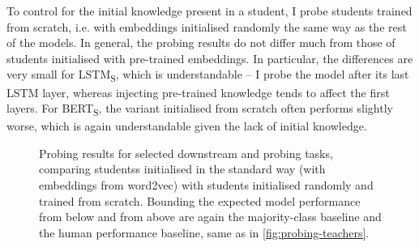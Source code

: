 \documentclass[bsc,frontabs,singlespacing,parskip,deptreport]{infthesis}
\def\BERTS{BERT\textsubscript{S}}
\def\LSTMS{LSTM\textsubscript{S}}
\begin{document}
{{{      To control for the initial knowledge present in a student, I probe students trained from scratch, i.e. with embeddings initialised randomly the same way as the rest of the models. In general, the probing results do not differ much from those of students initialised with pre-trained embeddings. In particular, the differences are very small for \LSTMS, which is understandable -- I probe the model after its last LSTM layer, whereas injecting pre-trained knowledge tends to affect the first layers. For \BERTS, the variant initialised from scratch often performs slightly worse, which is again understandable given the lack of initial knowledge.

      \begin{figure}[h!tb]
        \centering
        \caption{Probing results for selected downstream and probing tasks, comparing studentss initialised in the standard way (with embeddings from word2vec) with students initialised randomly and trained from scratch. Bounding the expected model performance from below and from above are again the majority-class baseline and the human performance baseline, same as in \autoref{fig:probing-teachers}.}
        \label{fig:probing-students-scratch-selected}
      \end{figure}

}}}
\end{document}
